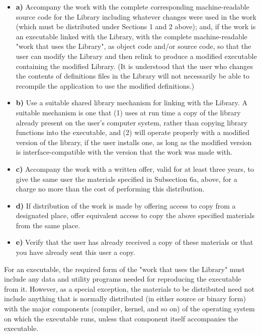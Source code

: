 \begin{itemize}
\item {\bf a)} Accompany the work with the complete corresponding
   machine-readable source code for the Library including whatever  changes were
   used in the work (which must be distributed under  Sections 1 and 2 above);
and, if the work is an executable linked  with the Library, with the complete
machine-readable "work that  uses the Library", as object code and/or source
code, so that the  user can modify the Library and then relink to produce a
modified  executable containing the modified Library. (It is understood  that
the user who changes the contents of definitions files in the  Library will
not necessarily be able to recompile the application  to use the modified
definitions.)
\item {\bf b)} Use a suitable shared library mechanism for linking with the
   Library. A suitable mechanism is one that (1) uses at run time a  copy of the
   library already present on the user's computer system,  rather than copying
library functions into the executable, and (2)  will operate properly with a
modified version of the library, if  the user installs one, as long as the
modified version is  interface-compatible with the version that the work was
made with.
\item {\bf c)} Accompany the work with a written offer, valid for at  least
   three years, to give the same user the materials  specified in Subsection 6a,
   above, for a charge no more  than the cost of performing this distribution.
\item {\bf d)} If distribution of the work is made by offering access to copy
   from a designated place, offer equivalent access to copy the above  specified
   materials from the same place.
\item {\bf e)} Verify that the user has already received a copy of these
   materials or that you have already sent this user a copy.
   \end{itemize}

For an executable, the required form of the "work that uses the Library"
must include any data and utility programs needed for reproducing the
executable from it. However, as a special exception, the materials to be
distributed need not include anything that is normally distributed (in either
source or binary form) with the major components (compiler, kernel, and so on)
of the operating system on which the executable runs, unless that component
itself accompanies the executable.

